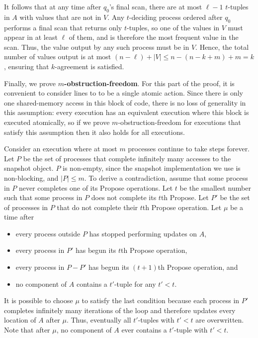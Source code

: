 \documentclass[11pt]{article}
\newcounter{linenum}
\newcounter{ind}
\newcommand{\lref}[1]{\linenumref{#1}}
\begin{document}
It follows that at any time after $q_0$'s final scan, there are at most $\ell-1$
$t$-tuples in $A$ with values that are not in $V$.
Any $t$-deciding process ordered after $q_0$ performs a final scan
that returns only $t$-tuples, so one of the values in $V$ must appear in at least
$\ell$ of them, and is therefore the most frequent value in the scan.
Thus, the value output by any such process must be in $V$.
Hence, the total number of  values output is at most $(n-\ell) + |V| \leq n-(n-k+m)+m = k$, ensuring that $k$-agreement is satisfied.

Finally, we prove {\bf $m$-obstruction-freedom}.
For this part of the proof, it is convenient to consider lines \lref{snap-anon}
to \lref{change-index-anon} to be a single atomic action.
Since there is only one shared-memory access in this block of code,
there is no loss of generality in this assumption:  every execution
has an equivalent execution where this block is executed atomically,
so if we prove $m$-obstruction-freedom for executions that satisfy this assumption 
then it also holds for all executions.

Consider an execution where at most $m$ processes continue to take steps forever.
Let $P$ be the set of processes that complete infinitely many accesses
to the snapshot object.  $P$ is non-empty, since the snapshot implementation
we use is non-blocking, and $|P|\leq m$.
To derive a contradiction, assume
that some process in $P$ never completes one of its {\sc Propose} operations.
Let $t$ be the smallest number such that some process in $P$ does not complete
its $t$th {\sc Propose}.
Let $P'$ be the set of processes in $P$ that do not complete their $t$th {\sc Propose}
operation.
Let $\mu$ be a time after 
\begin{itemize}
\item
every process outside $P$ has stopped performing updates on $A$,
\item
every process in $P'$ has begun its $t$th {\sc Propose} operation, 
\item
every process in $P-P'$ has begun its $(t+1)$th {\sc Propose} operation, and
\item
no component of $A$ contains a $t'$-tuple for any $t'<t$.
\end{itemize}
It is possible to choose $\mu$ to satisfy the last condition because
each process in $P'$ completes infinitely many iterations of the loop
and therefore updates
every location of $A$ after $\mu$.
Thus, eventually
all $t'$-tuples with $t'<t$ are overwritten.
Note that after $\mu$, no component of $A$ ever contains a $t'$-tuple with $t'<t$.
\end{document}
